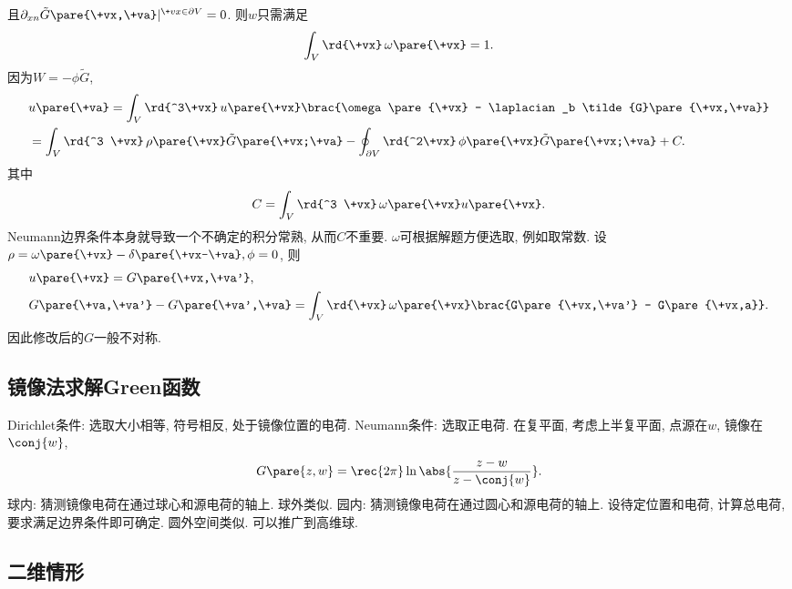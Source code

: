 \documentclass[hidelinks]{ctexart}
\begin{document}
且$\partial_{xn}\tilde{G}\pare{\+vx,\+va}\vert^{\+vx\in \partial V} = 0$. 则$w$只需满足
\[ \int_V \rd{\+vx}\,\omega\pare{\+vx} = 1. \]
因为$W = -\phi \tilde{G}$,
\begin{align*}
    & u\pare{\+va} = \int_V \rd{^3\+vx}\, u\pare{\+vx}\brac{\omega\pare{\+vx} - \laplacian_b \tilde{G}\pare{\+vx,\+va}} \\
    &= \int_V \rd{^3 \+vx}\, \rho\pare{\+vx}\tilde{G}\pare{\+vx;\+va} - \oint_{\partial V}\rd{^2\+vx}\,\phi\pare{\+vx}\tilde{G}\pare{\+vx;\+va}+C.
\end{align*}
其中
\[ C = \int_V \rd{^3 \+vx}\,\omega\pare{\+vx}u\pare{\+vx}. \]
\newpoint{}Neumann边界条件本身就导致一个不确定的积分常熟, 从而$C$不重要.
\newpoint{}$\omega$可根据解题方便选取, 例如取常数.
\newpoint{}设$\rho = \omega\pare{\+vx} - \delta\pare{\+vx-\+va},\phi = 0$, 则
\begin{align*}
    & u\pare{\+vx} = G\pare{\+vx,\+va'}, \\
    & G\pare{\+va,\+va'} - G\pare{\+va',\+va} = \int_V \rd{\+vx}\,\omega\pare{\+vx}\brac{G\pare{\+vx,\+va'} - G\pare{\+vx,a}}.
\end{align*}
\newpoint{}因此修改后的$G$一般不对称.


\subsection{镜像法求解Green函数} %
\label{sub:镜像法求解green函数}

\newpoint{}Dirichlet条件: 选取大小相等, 符号相反, 处于镜像位置的电荷.
\newpoint{}Neumann条件: 选取正电荷.
\newpoint{}在复平面, 考虑上半复平面, 点源在$w$, 镜像在$\conj{w}$,
\[ G\pare{z,w} = \rec{2\pi} \ln \abs{\frac{z-w}{z-\conj{w}}}. \]
\newpoint{}球内: 猜测镜像电荷在通过球心和源电荷的轴上.
\newpoint{}球外类似.
\newpoint{}园内: 猜测镜像电荷在通过圆心和源电荷的轴上.
\newpoint{}设待定位置和电荷, 计算总电荷, 要求满足边界条件即可确定.
\newpoint{}圆外空间类似.
\newpoint{}可以推广到高维球.


\subsection{二维情形} %
\label{sub:二维情形}
\end{document}
